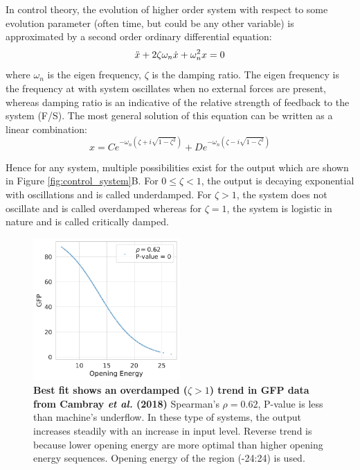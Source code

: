 In control theory, the evolution of higher order system with respect to some evolution parameter (often time, but could be any other variable) is approximated by a second order ordinary differential equation: 
\begin{equation}
    \Ddot{x} + 2\zeta\omega_n\dot{x} + \omega_n^2 x = 0
\end{equation}
where $\omega_n$ is the eigen frequency, $\zeta$ is the damping ratio. The eigen frequency is the frequency at with system oscillates when no external forces are present, whereas damping ratio is an indicative of the relative strength of feedback to the system (F/S). The most general solution of this equation can be written as a linear combination:
\begin{equation}
    x = Ce^{-\omega_n(\zeta + i\sqrt{1-\zeta^2})} + De^{-\omega_n(\zeta - i\sqrt{1-\zeta^2})}
\end{equation}

Hence for any system, multiple possibilities exist for the output which are shown in Figure \ref{fig:control_system}B. For $0 \leq \zeta < 1 $, the output is decaying exponential with oscillations and is called underdamped. For $\zeta > 1$, the system does not oscillate and is called overdamped whereas for $\zeta = 1$, the system is logistic in nature and is called critically damped. 



\begin{figure}
  \begin{center}
    \includegraphics[width=0.5\textwidth]{chapters/Discussion/Figures/cambray_fitting.pdf}
    \caption[Best fit shows an overdamped ($\zeta > 1$) trend in GFP data from Cambray \textit{et al.}]{\textbf{Best fit shows an overdamped ($\zeta > 1$) trend in GFP data from Cambray \textit{et al.} (2018)} Spearman's $\rho = 0.62$, P-value is less than machine's underflow. In these type of systems, the output increases steadily with an increase in input level. Reverse trend is because lower opening energy are more optimal than higher opening energy sequences. Opening energy of the region (-24:24) is used.}%
    \label{fig:refitting_data_cambray}
  \end{center}
\end{figure}

